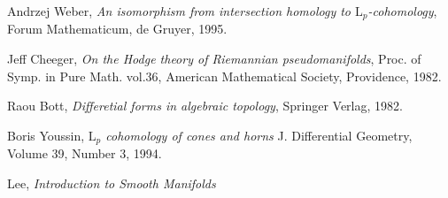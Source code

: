 \documentclass[licencjacka]{pracamgr}
\theoremstyle{definition}
\theoremstyle{definition}
\theoremstyle{plain}
\theoremstyle{plain}
\begin{document}

\begin{thebibliography}{99}

 Andrzej Weber, \textit{An isomorphism from
  intersection homology to $\mathrm{L}_p$-cohomology}, Forum
  Mathematicum, de Gruyer, 1995.
  
 Jeff Cheeger, \textit{On the Hodge theory
  of Riemannian pseudomanifolds}, Proc. of Symp. in Pure Math. vol.36,
  American Mathematical Society, Providence, 1982.

 Raou Bott, \textit{Differetial forms in algebraic
  topology}, Springer Verlag, 1982.

 Boris Youssin, \textit{$\mathrm{L}_p$
  cohomology of cones and horns } J. Differential Geometry, Volume 39,
  Number 3, 1994.
  
 Lee, \textit{Introduction to Smooth Manifolds}

\end{thebibliography}
\end{document}
